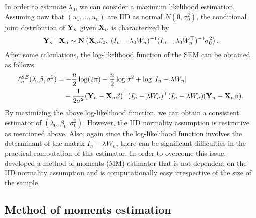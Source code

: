 \documentclass[11pt, A4paper, openany, uplatex]{book}
\begin{document}
In order to estimate $\lambda_0$, we can consider a maximum likelihood estimation.
Assuming now that $(u_1, \ldots , u_n)$ are IID as normal $N(0, \sigma_0^2)$, the conditional joint distribution of $\mathbf{Y}_n$  given $\mathbf{X}_n$ is characterized by
\[
	\mathbf{Y}_n \mid \mathbf{X}_n \sim \mathbf{N}\left(\mathbf{X}_n \beta_0, \; (I_n - \lambda_0 W_n)^{-1}(I_n - \lambda_0 W_n^\top)^{-1}\sigma^2_0 \right).
\]
After some calculations, the log-likelihood function of the SEM can be obtained as follows:
\begin{align*}
	\ell^{SE}_n(\lambda, \beta, \sigma^2) 
	& = -\frac{n}{2} \log (2\pi) -\frac{n}{2} \log\sigma^2 + \log | I_n - \lambda W_n| \\
	& \quad - \frac{1}{2\sigma^2} (\mathbf{Y}_n - \mathbf{X}_n \beta)^\top(I_n - \lambda W_n)^\top (I_n - \lambda W_n) (\mathbf{Y}_n  - \mathbf{X}_n \beta).
\end{align*}
By maximizing the above log-likelihood function, we can obtain a consistent estimator of $(\lambda_0, \beta_0, \sigma^2_0)$.
However, the IID normality assumption is restrictive as mentioned above.
Also, again since the log-likelihood function involves the determinant of the matrix $I_n - \lambda W_n$, there can be significant difficulties in the practical computation of this estimator.
In order to overcome this issue, \cite{kelejian1999generalized} developed a method of moments (MM) estimator that is not dependent on the IID normality assumption and is computationally easy irrespective of the size of the sample.

\subsection{Method of moments estimation}\label{subsec:mm}
\end{document}
